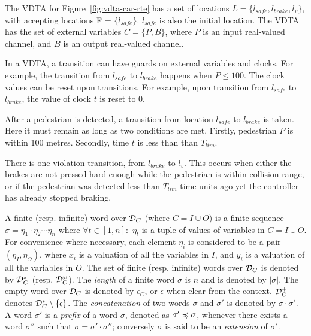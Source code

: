 \begin{example}	
	
	The \ac{VDTA} for Figure~\ref{fig:vdta-car-rte} has a set of
        locations $L = \{ l_{safe},l_{brake}, l_{v}\}$, with accepting
        locations F = $\{l_{safe}\}$. $l_{safe}$ is also the initial
        location.
	The \ac{VDTA} has the set of external variables  $C = \{P,
        B\}$, where $P$ is an input real-valued channel, 
        and $B$ is an output real-valued channel.
	
	In a VDTA, a transition can have guards on  external variables and clocks. 
	For example, the transition from $l_{safe}$ to $l_{brake}$
        happens when $P \leq 100$. 
	The clock values can be reset upon transitions. 
        For example, upon transition from $l_{safe}$ to $l_{brake}$, the value of clock $t$ is reset to 0.
        
    After a pedestrian is detected, a transition from location $l_{safe}$
    to $l_{brake}$ is taken. 
    Here it must remain as long as two conditions are met.
    Firstly, pedestrian $P$ is within 100 metres.
    Secondly, time $t$ is less than than $T_{lim}$.
    
    There is one violation transition, from $l_{brake}$ to $l_v$. 
    This occurs when either the brakes are not pressed hard enough while the
    pedestrian is within collision range, or if the pedestrian was detected less than $T_{lim}$ time units ago yet the controller has already stopped braking.
\end{example}
	
A finite (resp. infinite) word over ${\mathcal D}_C$ (where $C = I \cup O$) is a finite sequence $\sigma = \eta_1\cdot \eta_2 \cdots \eta_n$ where $\forall t \in [1,n]:$ $\eta_t$ is a tuple of values of variables in $C = I \cup O$. For convenience where necessary, each element $\eta_i$ is considered to be a pair $\left(\eta_I, \eta_O\right)$, where $x_i$ is a valuation of all the variables in $I$, and   $y_i$ is a valuation of all the variables in $O$.
The set of finite (resp. infinite) words over ${\mathcal D}_C$ is denoted by ${\mathcal D}_C^*$ (resp. ${\mathcal D}_C^\omega$).
The {\em length} of a finite word $\sigma$ is $n$ and is denoted by $|\sigma|$.
The empty word over ${\mathcal D}_C$ is denoted by $\epsilon_C$, or $\epsilon$ when clear from the context.
${\mathcal D}_C^+$ denotes ${\mathcal D}_C^*\setminus\{\epsilon\}$.
The {\em concatenation} of two words $\sigma$ and $\sigma'$ is denoted by $\sigma\cdot \sigma'$.
A word $\sigma'$ is a {\em prefix} of a word $\sigma$, denoted as $\sigma' \preccurlyeq \sigma$, whenever there exists a word $\sigma''$ such that $\sigma = \sigma'\cdot \sigma''$; conversely $\sigma$ is said to be an \emph{extension} of $\sigma'$.

